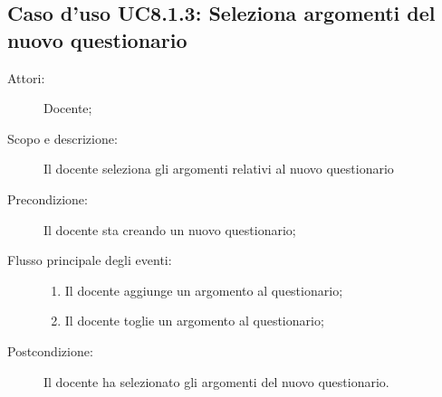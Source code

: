\subsection{Caso d'uso UC8.1.3: Seleziona argomenti del nuovo questionario}\begin{description}
\item[Attori:] Docente;
\item[Scopo e descrizione:] Il docente seleziona gli argomenti relativi al nuovo questionario 
      \item[Precondizione:] Il docente sta creando un nuovo questionario;

        \item[Flusso principale degli eventi:] \begin{enumerate}
          \item Il docente aggiunge un argomento al questionario;
          \item Il docente toglie un argomento al questionario;

      \end{enumerate}
    \item[Postcondizione:] Il docente ha selezionato gli argomenti del nuovo questionario.
  \end{description}
\hypertarget{UC8.2}{}
